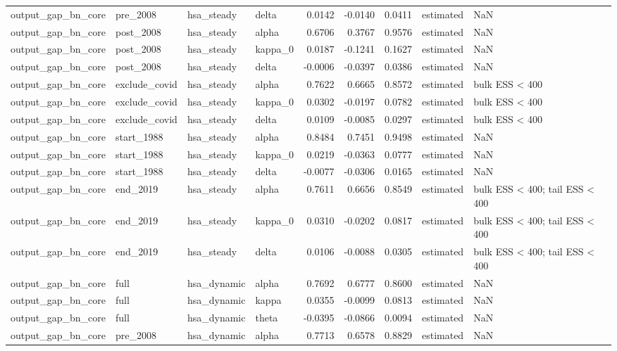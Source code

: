 \begin{tabular}{llllrrrll}
output\_gap\_bn\_core & pre\_2008 & hsa\_steady & delta & 0.0142 & -0.0140 & 0.0411 & estimated & NaN \\
output\_gap\_bn\_core & post\_2008 & hsa\_steady & alpha & 0.6706 & 0.3767 & 0.9576 & estimated & NaN \\
output\_gap\_bn\_core & post\_2008 & hsa\_steady & kappa\_0 & 0.0187 & -0.1241 & 0.1627 & estimated & NaN \\
output\_gap\_bn\_core & post\_2008 & hsa\_steady & delta & -0.0006 & -0.0397 & 0.0386 & estimated & NaN \\
output\_gap\_bn\_core & exclude\_covid & hsa\_steady & alpha & 0.7622 & 0.6665 & 0.8572 & estimated & bulk ESS < 400 \\
output\_gap\_bn\_core & exclude\_covid & hsa\_steady & kappa\_0 & 0.0302 & -0.0197 & 0.0782 & estimated & bulk ESS < 400 \\
output\_gap\_bn\_core & exclude\_covid & hsa\_steady & delta & 0.0109 & -0.0085 & 0.0297 & estimated & bulk ESS < 400 \\
output\_gap\_bn\_core & start\_1988 & hsa\_steady & alpha & 0.8484 & 0.7451 & 0.9498 & estimated & NaN \\
output\_gap\_bn\_core & start\_1988 & hsa\_steady & kappa\_0 & 0.0219 & -0.0363 & 0.0777 & estimated & NaN \\
output\_gap\_bn\_core & start\_1988 & hsa\_steady & delta & -0.0077 & -0.0306 & 0.0165 & estimated & NaN \\
output\_gap\_bn\_core & end\_2019 & hsa\_steady & alpha & 0.7611 & 0.6656 & 0.8549 & estimated & bulk ESS < 400; tail ESS < 400 \\
output\_gap\_bn\_core & end\_2019 & hsa\_steady & kappa\_0 & 0.0310 & -0.0202 & 0.0817 & estimated & bulk ESS < 400; tail ESS < 400 \\
output\_gap\_bn\_core & end\_2019 & hsa\_steady & delta & 0.0106 & -0.0088 & 0.0305 & estimated & bulk ESS < 400; tail ESS < 400 \\
output\_gap\_bn\_core & full & hsa\_dynamic & alpha & 0.7692 & 0.6777 & 0.8600 & estimated & NaN \\
output\_gap\_bn\_core & full & hsa\_dynamic & kappa & 0.0355 & -0.0099 & 0.0813 & estimated & NaN \\
output\_gap\_bn\_core & full & hsa\_dynamic & theta & -0.0395 & -0.0866 & 0.0094 & estimated & NaN \\
output\_gap\_bn\_core & pre\_2008 & hsa\_dynamic & alpha & 0.7713 & 0.6578 & 0.8829 & estimated & NaN \\

\end{tabular}
